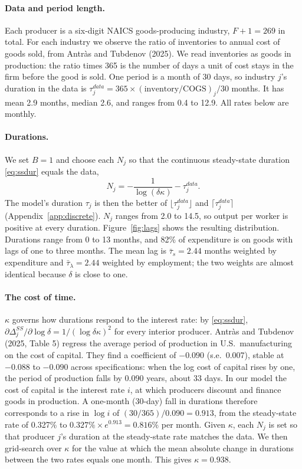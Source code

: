 \documentclass[11pt]{article}
\theoremstyle{definition}
\begin{document}
\paragraph{Data and period length.}
Each producer is a six-digit NAICS goods-producing industry, $F+1=269$ in total. For each industry we
observe the ratio of inventories to annual cost of goods sold, from Antr\`as and Tubdenov (2025).
We read inventories as goods in production: the ratio times 365 is the number of days a unit of cost
stays in the firm before the good is sold. One period is a month of 30 days, so industry $j$'s
duration in the data is $\tau_j^{data}=365\times(\text{inventory}/\text{COGS})_j/30$ months. It has
mean 2.9 months, median 2.6, and ranges from 0.4 to 12.9. All rates below are monthly.

\paragraph{Durations.}
We set $B=1$ and choose each $N_j$ so that the continuous steady-state duration \eqref{eq:ssdur}
equals the data,
\[
  N_j=-\frac{1}{\log(\delta\kappa)}-\tau_j^{data}.
\]
The model's duration $\tau_j$ is then the better of $\lfloor\tau_j^{data}\rfloor$ and
$\lceil\tau_j^{data}\rceil$ (Appendix~\ref{app:discrete}). $N_j$ ranges from 2.0 to 14.5, so output per
worker is positive at every duration. Figure~\ref{fig:lags} shows the resulting distribution.
Durations range from 0 to 13 months, and 82\% of expenditure is on goods with lags of one to three
months. The mean lag is $\bar\tau_s=2.44$ months weighted by expenditure and $\bar\tau_\lambda=2.44$
weighted by employment; the two weights are almost identical because $\delta$ is close to one.

\paragraph{The cost of time.}
$\kappa$ governs how durations respond to the interest rate: by \eqref{eq:ssdur},
$\partial\Delta_j^{SS}/\partial\log\delta=1/(\log\delta\kappa)^2$ for every interior producer. Antr\`as and Tubdenov (2025, Table 5) regress the average period of
production in U.S.\ manufacturing on the cost of capital. They find a coefficient of $-0.090$ (s.e.\
0.007), stable at $-0.088$ to $-0.090$ across specifications: when the log cost of capital rises by one,
the period of production falls by 0.090 years, about 33 days. In our model the cost of capital is the
interest rate $i$, at which producers discount and finance goods in production. A one-month
(30-day) fall in durations therefore corresponds to a rise in $\log i$ of $(30/365)/0.090=0.913$, from
the steady-state rate of 0.327\% to $0.327\%\times e^{0.913}=0.816\%$ per month. Given $\kappa$, each
$N_j$ is set so that producer $j$'s duration at the steady-state rate matches the data. We then
grid-search over $\kappa$ for the value at which the mean absolute change in durations between the
two rates equals one month. This gives $\kappa=0.938$.
\end{document}
